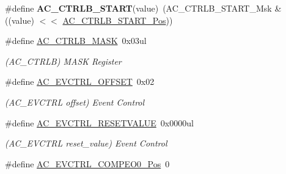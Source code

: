 \begin{DoxyCompactItemize}
\item 
\hypertarget{group___s_a_m_l21___a_c_ga2e0762e0d784e23812c63d912820843b}{}\#define {\bfseries A\+C\+\_\+\+C\+T\+R\+L\+B\+\_\+\+S\+T\+A\+R\+T}(value)~(A\+C\+\_\+\+C\+T\+R\+L\+B\+\_\+\+S\+T\+A\+R\+T\+\_\+\+Msk \& ((value) $<$$<$ \hyperlink{group___s_a_m_l21___a_c_ga5699a352a32415762e7ae47f727c34e2}{A\+C\+\_\+\+C\+T\+R\+L\+B\+\_\+\+S\+T\+A\+R\+T\+\_\+\+Pos}))\label{group___s_a_m_l21___a_c_ga2e0762e0d784e23812c63d912820843b}

\item 
\hypertarget{group___s_a_m_l21___a_c_ga877d20a90ea3bf5063d3465e511670bf}{}\#define \hyperlink{group___s_a_m_l21___a_c_ga877d20a90ea3bf5063d3465e511670bf}{A\+C\+\_\+\+C\+T\+R\+L\+B\+\_\+\+M\+A\+S\+K}~0x03ul\label{group___s_a_m_l21___a_c_ga877d20a90ea3bf5063d3465e511670bf}

\begin{DoxyCompactList}\small\item\em (A\+C\+\_\+\+C\+T\+R\+L\+B) M\+A\+S\+K Register \end{DoxyCompactList}\item 
\hypertarget{group___s_a_m_l21___a_c_ga2084b522a096a69a32b82b24e5e56b35}{}\#define \hyperlink{group___s_a_m_l21___a_c_ga2084b522a096a69a32b82b24e5e56b35}{A\+C\+\_\+\+E\+V\+C\+T\+R\+L\+\_\+\+O\+F\+F\+S\+E\+T}~0x02\label{group___s_a_m_l21___a_c_ga2084b522a096a69a32b82b24e5e56b35}

\begin{DoxyCompactList}\small\item\em (A\+C\+\_\+\+E\+V\+C\+T\+R\+L offset) Event Control \end{DoxyCompactList}\item 
\hypertarget{group___s_a_m_l21___a_c_gada78dcdc73d5a68c8647ba0ec61004e3}{}\#define \hyperlink{group___s_a_m_l21___a_c_gada78dcdc73d5a68c8647ba0ec61004e3}{A\+C\+\_\+\+E\+V\+C\+T\+R\+L\+\_\+\+R\+E\+S\+E\+T\+V\+A\+L\+U\+E}~0x0000ul\label{group___s_a_m_l21___a_c_gada78dcdc73d5a68c8647ba0ec61004e3}

\begin{DoxyCompactList}\small\item\em (A\+C\+\_\+\+E\+V\+C\+T\+R\+L reset\+\_\+value) Event Control \end{DoxyCompactList}\item 
\hypertarget{group___s_a_m_l21___a_c_gaa70b302d7f87b0f6d8ab915ca5b7bf8f}{}\#define \hyperlink{group___s_a_m_l21___a_c_gaa70b302d7f87b0f6d8ab915ca5b7bf8f}{A\+C\+\_\+\+E\+V\+C\+T\+R\+L\+\_\+\+C\+O\+M\+P\+E\+O0\+\_\+\+Pos}~0\label{group___s_a_m_l21___a_c_gaa70b302d7f87b0f6d8ab915ca5b7bf8f}


\end{DoxyCompactItemize}
